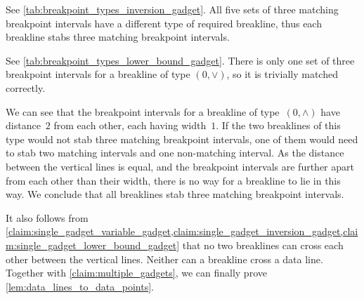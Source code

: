 \begin{claimproof}
    See \cref{tab:breakpoint_types_inversion_gadget}.
    All five sets of three matching breakpoint intervals have a different type of required breakline, thus each breakline stabs three matching breakpoint intervals.
\end{claimproof}


\begin{claimproof}
    See \cref{tab:breakpoint_types_lower_bound_gadget}.
    There is only one set of three breakpoint intervals for a breakline of type $(0,\vee)$, so it is trivially matched correctly.

    We can see that the breakpoint intervals for a breakline of type~$(0,\wedge)$ have distance~$2$ from each other, each having width~$1$.
    If the two breaklines of this type would not stab three matching breakpoint intervals, one of them would need to stab two matching intervals and one non-matching interval.
    As the distance between the vertical lines is equal, and the breakpoint intervals are further apart from each other than their width, there is no way for a breakline to lie in this way.
    We conclude that all breaklines stab three matching breakpoint intervals.
\end{claimproof}

It also follows from \cref{claim:single_gadget_variable_gadget,claim:single_gadget_inversion_gadget,claim:single_gadget_lower_bound_gadget} that no two breaklines can cross each other between the vertical lines.
Neither can a breakline cross a data line.
Together with \cref{claim:multiple_gadgets}, we can finally prove \cref{lem:data_lines_to_data_points}.

